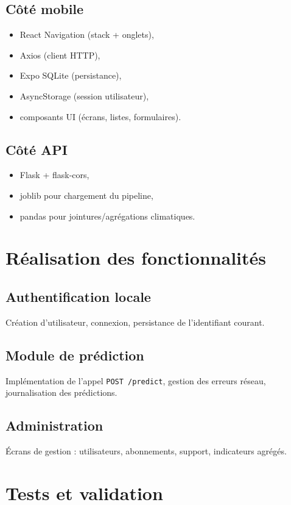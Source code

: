 \documentclass[12pt,a4paper,twoside,openright]{report}
\begin{document}
\subsection{Côté mobile}
\begin{itemize}
  \item React Navigation (stack + onglets),
  \item Axios (client HTTP),
  \item Expo SQLite (persistance),
  \item AsyncStorage (session utilisateur),
  \item composants UI (écrans, listes, formulaires).
\end{itemize}

\subsection{Côté API}
\begin{itemize}
  \item Flask + flask-cors,
  \item joblib pour chargement du pipeline,
  \item pandas pour jointures/agrégations climatiques.
\end{itemize}

\section{Réalisation des fonctionnalités}

\subsection{Authentification locale}
Création d'utilisateur, connexion, persistance de l'identifiant courant.

\subsection{Module de prédiction}
Implémentation de l'appel \texttt{POST /predict}, gestion des erreurs réseau, journalisation des prédictions.

\subsection{Administration}
Écrans de gestion : utilisateurs, abonnements, support, indicateurs agrégés.

\section{Tests et validation}
\end{document}
